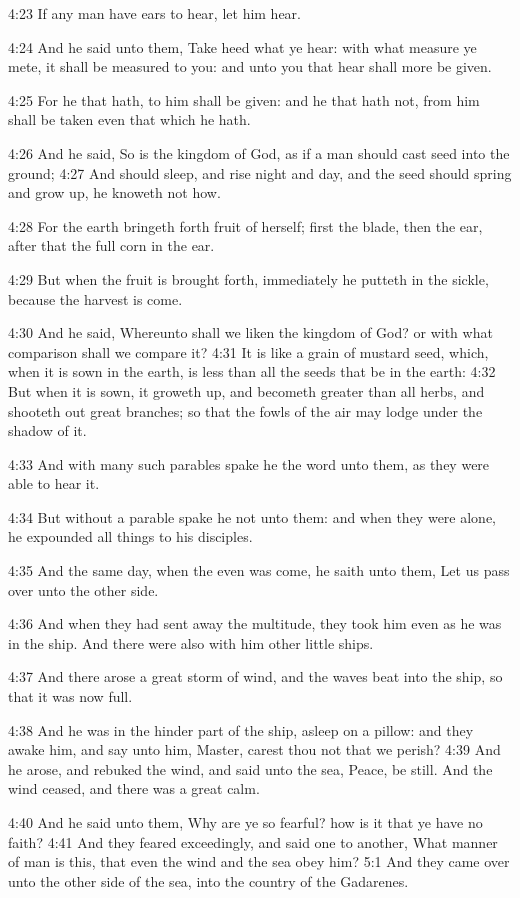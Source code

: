4:23 If any man have ears to hear, let him hear.

4:24 And he said unto them, Take heed what ye hear: with what measure
ye mete, it shall be measured to you: and unto you that hear shall
more be given.

4:25 For he that hath, to him shall be given: and he that hath not,
from him shall be taken even that which he hath.

4:26 And he said, So is the kingdom of God, as if a man should cast
seed into the ground; 4:27 And should sleep, and rise night and day,
and the seed should spring and grow up, he knoweth not how.

4:28 For the earth bringeth forth fruit of herself; first the blade,
then the ear, after that the full corn in the ear.

4:29 But when the fruit is brought forth, immediately he putteth in
the sickle, because the harvest is come.

4:30 And he said, Whereunto shall we liken the kingdom of God? or with
what comparison shall we compare it?  4:31 It is like a grain of
mustard seed, which, when it is sown in the earth, is less than all
the seeds that be in the earth: 4:32 But when it is sown, it groweth
up, and becometh greater than all herbs, and shooteth out great
branches; so that the fowls of the air may lodge under the shadow of
it.

4:33 And with many such parables spake he the word unto them, as they
were able to hear it.

4:34 But without a parable spake he not unto them: and when they were
alone, he expounded all things to his disciples.

4:35 And the same day, when the even was come, he saith unto them, Let
us pass over unto the other side.

4:36 And when they had sent away the multitude, they took him even as
he was in the ship. And there were also with him other little ships.

4:37 And there arose a great storm of wind, and the waves beat into
the ship, so that it was now full.

4:38 And he was in the hinder part of the ship, asleep on a pillow:
and they awake him, and say unto him, Master, carest thou not that we
perish?  4:39 And he arose, and rebuked the wind, and said unto the
sea, Peace, be still. And the wind ceased, and there was a great calm.

4:40 And he said unto them, Why are ye so fearful? how is it that ye
have no faith?  4:41 And they feared exceedingly, and said one to
another, What manner of man is this, that even the wind and the sea
obey him?  5:1 And they came over unto the other side of the sea, into
the country of the Gadarenes.

